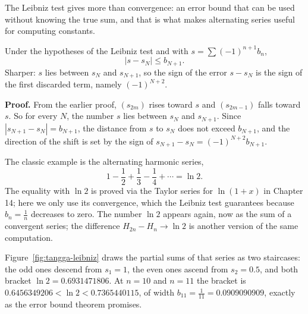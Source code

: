 The Leibniz test gives more than convergence: an error bound that can
be used without knowing the true sum, and that is what makes alternating series useful for
computing constants.

\begin{teorema}
Under the hypotheses of the Leibniz test and with $s = \sum (-1)^{n+1} b_n$,
\[
  \left| s - s_N \right| \le b_{N+1}.
\]
Sharper: $s$ lies between $s_N$ and $s_{N+1}$, so the sign of the error $s - s_N$ is the
sign of the first discarded term, namely $(-1)^{N+2}$.
\end{teorema}

\noindent\textbf{Proof.} From the earlier proof, $(s_{2m})$ rises toward $s$ and
$(s_{2m-1})$ falls toward $s$. So for every $N$, the number $s$ lies between $s_N$ and
$s_{N+1}$. Since $|s_{N+1} - s_N| = b_{N+1}$, the distance from $s$ to $s_N$ does not
exceed $b_{N+1}$, and the direction of the shift is set by the sign of
$s_{N+1} - s_N = (-1)^{N+2} b_{N+1}$.

The classic example is the alternating harmonic series,
\[
  1 - \frac{1}{2} + \frac{1}{3} - \frac{1}{4} + \cdots = \ln 2 .
\]
The equality with $\ln 2$ is proved via the Taylor series for $\ln(1+x)$ in Chapter 14;
here we only use its convergence, which the Leibniz test guarantees because
$b_n = \frac{1}{n}$ decreases to zero. The number $\ln 2$ appears again, now as the sum of
a convergent series; the difference $H_{2n} - H_n \to \ln 2$ is another version of the same
computation.

Figure~\ref{fig:tangga-leibniz} draws the partial sums of that series as two staircases:
the odd ones descend from $s_1 = 1$, the even ones ascend from $s_2 = 0.5$, and both
bracket $\ln 2 = 0.6931471806$. At $n = 10$ and $n = 11$ the bracket is
$0.6456349206 < \ln 2 < 0.7365440115$, of width $b_{11} = \tfrac{1}{11} = 0.0909090909$,
exactly as the error bound theorem promises.

